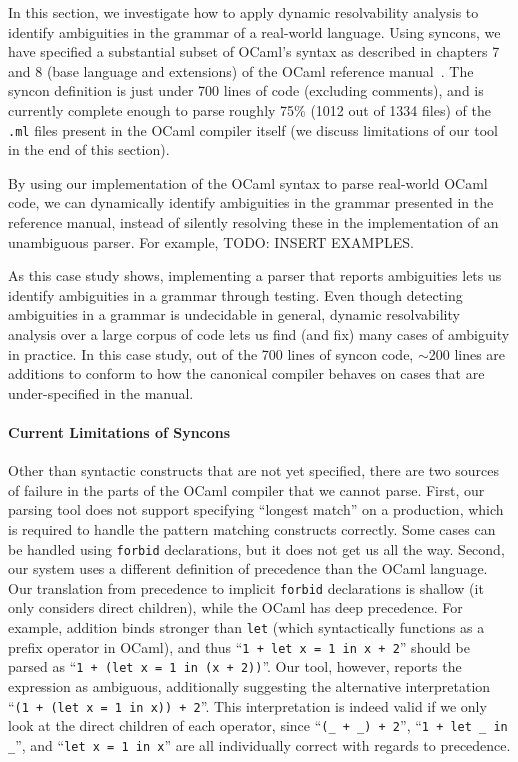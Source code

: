 \documentclass[acmsmall,review,anonymous]{acmart}\settopmatter{printfolios=true,printccs=false,printacmref=false}
\newcommand{\ocaml}{\lstinline[language={[objective]caml}]}
\newcommand{\syncon}{\lstinline[language=syncon]}
\begin{document}
In this section, we investigate how to apply dynamic resolvability
analysis to identify ambiguities in the grammar of a real-world
language.
%
Using syncons, we have specified a substantial subset of OCaml's
syntax as described in chapters 7 and 8 (base language and
extensions) of the OCaml reference manual~\cite{OCamlReference}.
The syncon definition is just under 700 lines of code (excluding
comments), and is currently complete enough to parse roughly 75\%
(1012 out of 1334 files) of the \verb|.ml| files present in the
OCaml compiler itself (we discuss limitations of our tool in the
end of this section).

By using our implementation of the OCaml syntax to parse
real-world OCaml code, we can dynamically identify ambiguities in
the grammar presented in the reference manual, instead of silently
resolving these in the implementation of an unambiguous parser.
%
For example, TODO: INSERT EXAMPLES.

As this case study shows, implementing a parser that reports
ambiguities lets us identify ambiguities in a grammar through
testing. Even though detecting ambiguities in a grammar is
undecidable in general, dynamic resolvability analysis over a
large corpus of code lets us find (and fix) many cases of
ambiguity in practice.
%
In this case study, out of the 700 lines of syncon code, $\sim$200
lines are additions to conform to how the canonical compiler
behaves on cases that are under-specified in the manual.


\paragraph{Current Limitations of Syncons}
%
Other than syntactic constructs that are not yet specified, there
are two sources of failure in the parts of the OCaml compiler that
we cannot parse.
%
First, our parsing tool does not support specifying ``longest
match'' on a production, which is required to handle the pattern
matching constructs correctly. Some cases can be handled using
\syncon{forbid} declarations, but it does not get us all the way.
%
Second, our system uses a different definition of precedence than
the OCaml language. Our translation from precedence to implicit
\syncon{forbid} declarations is shallow (it only considers direct
children), while the OCaml has deep precedence. For example,
addition binds stronger than \ocaml{let} (which syntactically
functions as a prefix operator in OCaml), and thus
%
``\ocaml{1 + let x = 1 in x + 2}'' should be parsed as
%
``\ocaml{1 + (let x = 1 in (x + 2))}''. Our tool, however, reports
the expression as ambiguous, additionally suggesting the
alternative interpretation
%
``\ocaml{(1 + (let x = 1 in x)) + 2}''.
%
This interpretation is indeed valid if we only look at the direct
children of each operator, since ``\ocaml{(_ + _) + 2}'',
``\ocaml{1 + let _ in _}'', and ``\ocaml{let x = 1 in x}'' are all
individually correct with regards to precedence.
\end{document}
